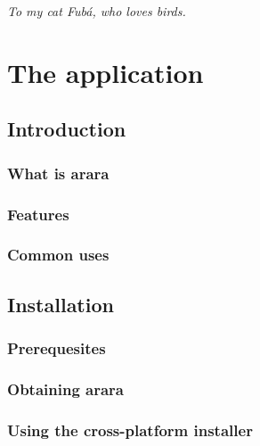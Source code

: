 \documentclass[a4paper,twoside,12pt]{memoir}
\begin{document}
\vspace*{25em}

\begin{flushright}
\em To my cat Fubá, who loves birds.
\end{flushright}

\cleardoublepage

\tableofcontents*

\cleardoublepage

\listoffigures*

\cleardoublepage

\listoftables*

\cleardoublepage

\listofcodes*

\mainmatter

\part{The application}

\chapter{Introduction}
\section{What is arara}
\section{Features}
\section{Common uses}

\chapter{Installation}
\section{Prerequesites}
\section{Obtaining arara}
\section{Using the cross-platform installer}
\end{document}
